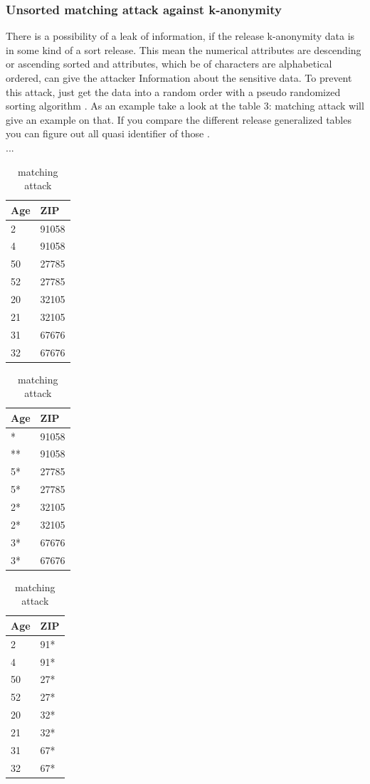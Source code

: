 \documentclass{llncs}
\begin{document}
\subsubsection{Unsorted matching attack against k-anonymity}
There is a possibility of a leak of information, if the release k-anonymity data is in some kind of a sort release. This mean the numerical attributes are descending or ascending sorted and attributes, which be of characters are alphabetical ordered, can give the attacker Information about the sensitive data. To prevent this attack, just get the data into a random order with a pseudo randomized sorting algorithm \cite{sweeney2002k}. As an example take a look at the table 3: matching attack  will give an example on that. If you compare the different release generalized tables you can figure out all quasi identifier of those \cite{sweeney2002k}.
\\...
\begin{table}	
	\caption{matching attack}
	\centering
	\begin{tabular}[t]{|l|l|}		
	\hline
	Age & ZIP   \\ \hline
	2   & 91058 \\ 
	4   & 91058 \\ 
	50  & 27785 \\ 
	52  & 27785 \\ 
	20  & 32105 \\ 
	21  & 32105 \\ 
	31  & 67676 \\ 
	32  & 67676 \\ \hline
		\end{tabular}
	\hfill
	\begin{tabular}[t]{|l|l|}
	\hline
	Age & ZIP   \\ \hline
	*   & 91058 \\
	**   & 91058 \\
	5*  & 27785 \\
	5*  & 27785 \\
	2*  & 32105 \\
	2*  & 32105 \\
	3*  & 67676 \\
	3*  & 67676 \\ \hline  
	\end{tabular}
	\hfill
	\begin{tabular}[t]{|l|l|}
	\hline
	Age & ZIP   \\	\hline
	2   & 91*   \\
	4   & 91*   \\
	50  & 27*   \\
	52  & 27*   \\
	20  & 32*   \\
	21  & 32*   \\
	31  & 67*   \\
	32  & 67*   \\ \hline  
	\end{tabular}
\end{table}
\end{document}
